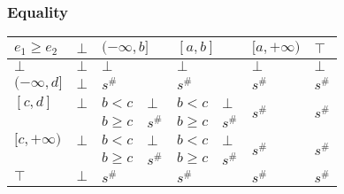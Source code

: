 \documentclass{beamer}
\begin{document}
        \begin{frame}
            \frametitle{Equality}
        \begin{table}
            \begin{tabular}{|l|l|ll|ll|l|l|}
            \hline
            $e_1 \ge e_2$  & $\bot$ & \multicolumn{2}{l|}{$(-\infty, b]$} & \multicolumn{2}{l|}{$[a, b]$} & $[a, +\infty)$          & $\top$                  \\ \hline
            $\bot$         & $\bot$ & \multicolumn{2}{l|}{$\bot$}         & \multicolumn{2}{l|}{$\bot$}   & $\bot$                  & $\bot$                  \\ \hline
            $(-\infty, d]$ & $\bot$ & \multicolumn{2}{l|}{$s^\#$}         & \multicolumn{2}{l|}{$s^\#$}   & $s^\#$                  & $s^\#$                  \\ \hline
            $[c, d]$       & $\bot$ & $b < c$            & $\bot$         & $b < c$         & $\bot$      & \multirow{2}{*}{$s^\#$} & \multirow{2}{*}{$s^\#$} \\
                            &        & $b \ge c$          & $s^\#$         & $b \ge c$       & $s^\#$      &                         &                         \\ \hline
            $[c, +\infty)$ & $\bot$ & $b < c$            & $\bot$         & $b < c$         & $\bot$      & \multirow{2}{*}{$s^\#$} & \multirow{2}{*}{$s^\#$} \\
                            &        & $b \ge c$          & $s^\#$         & $b \ge c$       & $s^\#$      &                         &                         \\ \hline
            $\top$         & $\bot$ & \multicolumn{2}{l|}{$s^\#$}         & \multicolumn{2}{l|}{$s^\#$}   & $s^\#$                  & $s^\#$                  \\ \hline
            \end{tabular}
            \end{table}
        \end{frame}
\end{document}
